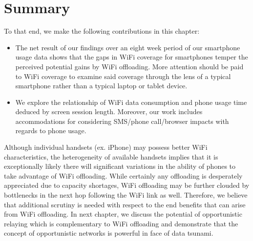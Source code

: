 \section{Summary}
To that end, we make the following contributions in this chapter:

\begin{itemize}

\item The net result of our findings over an eight week period of our smartphone
usage data shows that the gaps in WiFi coverage for smartphones temper the perceived potential gains by 
WiFi offloading. More attention should be paid to WiFi coverage to examine said coverage through the
lens of a typical smartphone rather than a typical laptop or tablet device. 

\item We explore the relationship of WiFi data consumption and phone usage time deduced by screen session length. Moreover,
our work includes accommodations for considering SMS/phone call/browser impacts with regards to phone usage.

\end{itemize}
Although individual handsets (ex. iPhone) may possess better WiFi characteristics, the heterogeneity
of available handsets implies that it is exceptionally likely there will significant variations in the ability of phones to
take advantage of WiFi offloading. While certainly any offloading is desperately appreciated due to capacity
shortages, WiFi offloading may be further clouded by bottlenecks in the next hop following the WiFi link as well. Therefore, we believe that additional scrutiny is needed with respect to the end benefits that can arise from WiFi offloading. In next chapter, we discuss the potential of opportunistic relaying which is complementary to WiFi offloading and demonstrate that the concept of opportunistic networks is powerful in face of data tsunami. 

